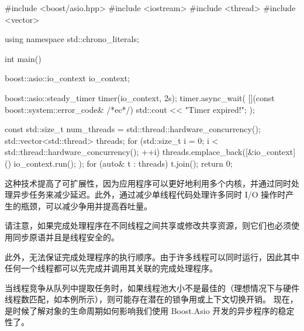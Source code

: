\begin{cpp}
#include <boost/asio.hpp>
#include <iostream>
#include <thread>
#include <vector>

using namespace std::chrono_literals;

int main() {
    boost::asio::io_context io_context;

    boost::asio::steady_timer timer(io_context, 2s);
    timer.async_wait(
    [](const boost::system::error_code& /*ec*/) {
        std::cout << "Timer expired!\n";
    });

    const std::size_t num_threads =
                std::thread::hardware_concurrency();
    std::vector<std::thread> threads;
    for (std::size_t i = 0;
        i < std::thread::hardware_concurrency(); ++i) {
            threads.emplace_back([&io_context]() {
                io_context.run();
            });
    }
    for (auto& t : threads) {
        t.join();
    }
    return 0;
}
\end{cpp}

这种技术提高了可扩展性，因为应用程序可以更好地利用多个内核，并通过同时处理异步任务来减少延迟。此外，通过减少单线程代码处理许多同时 I/O 操作时产生的瓶颈，可以减少争用并提高吞吐量。

请注意，如果完成处理程序在不同线程之间共享或修改共享资源，则它们也必须使用同步原语并且是线程安全的。

此外，无法保证完成处理程序的执行顺序。由于许多线程可以同时运行，因此其中任何一个线程都可以先完成并调用其关联的完成处理程序。

当线程竞争从队列中提取任务时，如果线程池大小不是最佳的（理想情况下与硬件线程数匹配，如本例所示），则可能存在潜在的锁争用或上下文切换开销。
现在，是时候了解对象的生命周期如何影响我们使用 Boost.Asio 开发的异步程序的稳定性了。






























